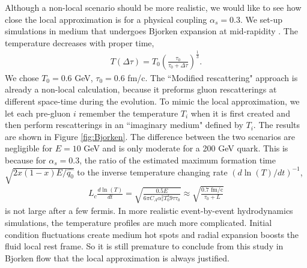\documentclass[aps, prc, reprint, amsmath, groupedaddress, nofootinbib]{revtex4-1}
\begin{document}
Although a non-local scenario should be more realistic, we would like to see how close the local approximation is for a physical coupling $\alpha_s = 0.3$.
We set-up simulations in medium that undergoes Bjorken expansion at mid-rapidity \cite{PhysRevD.27.140}. 
The temperature decreases with proper time,
\begin{eqnarray}
T(\Delta\tau) = T_0 \left(\frac{\tau_0}{\tau_0+\Delta\tau}\right)^{\frac{1}{3}}.
\end{eqnarray}
We chose $T_0=0.6$ GeV, $\tau_0=0.6$ fm/c.
The ``Modified rescattering" approach is already a non-local calculation, because it preforms gluon rescatterings at different space-time during the evolution. 
To mimic the local approximation, we let each pre-gluon $i$ remember the temperature $T_i$ when it is first created and then perform rescatterings in an ``imaginary medium" defined by $T_i$.
The results are shown in Figure \ref{fig:Bjorken}. 
The difference between the two scenarios are negligible for $E=10$ GeV and is only moderate for a 200 GeV quark.
This is because for $\alpha_s = 0.3$, the ratio of the estimated maximum formation time $\sqrt{2x(1-x)E/\hat{q_0}}$ to the inverse temperature changing rate $(d\ln(T)/dt)^{-1}$,
\begin{eqnarray}
L_c \frac{d\ln(T)}{dt} = \sqrt{\frac{0.5 E}{6\pi C_A\alpha_s^2 T_0^3 9\tau\tau_0}} \approx \sqrt{\frac{0.7 \textrm{ fm/c}}{\tau_0+L}}
\end{eqnarray}
is not large after a few fermis. 
In more realistic event-by-event hydrodynamics simulations, the temperature profiles are much more complicated.
Initial condition fluctuations create medium hot spots and radial expansion boosts the fluid local  rest frame.
So it is still premature to conclude from this study in Bjorken flow that the local approximation is always justified.
\end{document}
